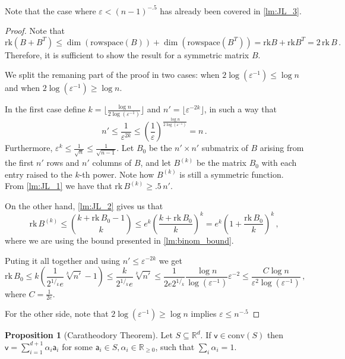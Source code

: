 \documentclass[12pt]{amsart}
\theoremstyle{definition}
\newtheorem{prop}[thm]{Proposition}
\newcommand{\R}{\mathbb{R}}
\newcommand{\vv}{\mathsf{v}}
\newcommand{\va}{\mathsf{a}}
\newcommand{\rk}{\mathrm{rk}}
\newcommand{\conv}{\mathrm{conv}}
\begin{document}
Note that the case where $\varepsilon < (n-1)^{-.5}$ has already been covered in \cref{lm:JL_3}.

\begin{proof}
Note that 
$$\rk(B + B^T) \leq \dim( \mathrm{rowspace}(B) ) + \dim( \mathrm{rowspace}(B^T) ) =  \rk B + \rk B^T  = 2 \, \rk \, B\, . $$ 
Therefore, it is sufficient to show the result for a symmetric matrix $B$.

We split the remaning part of the proof in two cases: when $2 \log(\varepsilon^{-1}) \leq \log n$ and when $2 \log(\varepsilon^{-1}) \geq \log n$.

In the first case define $k = \lfloor \frac{\log n}{2 \log ( \varepsilon^{-1})} \rfloor$ and $n' = \lfloor \varepsilon^{-2k} \rfloor$, in such a way that 
$$ n' \leq \frac{1}{\varepsilon^{2k}} \leq \left( \frac{1}{\varepsilon} \right)^{\frac{\log n}{2 \log(\varepsilon^{-1})}} = n\, . $$
Furthermore, $\varepsilon^k \leq \frac{1}{\sqrt{n}} \leq \frac{1}{\sqrt{n-1}}$.
Let $B_0$ be the $n'\times n'$ submatrix of $B$ arising from the first $n'$ rows and $n'$ columns of $B$, and let $B^{(k)}$ be the matrix $B_0$ with each entry raised to the $k$-th power.
Note how $B^{(k)}$ is still a symmetric function.
From \cref{lm:JL_1} we have that $\rk \, B^{(k)} \geq .5 \, n'$.

On the other hand, \cref{lm:JL_2} gives us that 
$$\rk \, B^{(k)} \leq \binom{k + \rk\, B_0 - 1}{k} \leq e^k \left( \frac{k + \rk \, B_0}{k}\right)^k =  e^k \left(1 +  \frac{\rk \, B_0}{k}\right)^k\, , $$
where we are using the bound presented in \cref{lm:binom_bound}.

Puting it all together and using $n' \leq \varepsilon^{-2k}$ we get 
$$ \rk \, B_0 \leq k \left( \frac{1}{2^{1/_k} e} \sqrt[k]{n'} - 1\right)  \leq  \frac{k}{2^{1/_k} e} \sqrt[k]{n'} \leq \frac{1}{2e  2^{1/_k} }\frac{\log n}{\log(\varepsilon^{-1})}\varepsilon^{-2} \leq \frac{C \log n}{\varepsilon^2 \log(\varepsilon^{-1})}\, , $$
where $C = \frac{1}{2e}$.

For the other side, note that $2 \log(\varepsilon^{-1}) \geq \log n$ implies $\varepsilon \leq n^{-.5}$

\end{proof}




\begin{prop}[Caratheodory Theorem]
Let $S \subseteq \R^d$.
If $\vv \in \conv (S)$ then $\vv = \sum_{i=1}^{d+1} \alpha_i \va_i$ for some $\va_i \in S, \alpha_i \in \R_{\geq 0}$, such that $\sum_i \alpha_i = 1$.
\end{prop}
\end{document}
